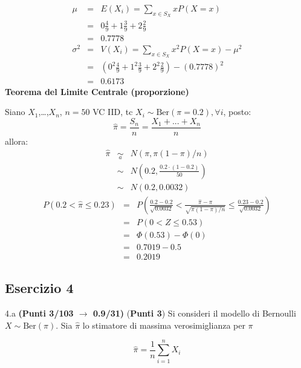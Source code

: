 \documentclass[
  11pt,
]{book}
\theoremstyle{mytheoremstyle}
\theoremstyle{mydefstyle}
\newenvironment{sol}
  {
  \begin{tcolorbox}[enhanced,breakable,arc=0.1mm,boxrule=1pt,colback=white,colframe=iblue,
  title=\bf \fontfamily{lmss}\selectfont \hspace{.5 cm} Soluzione,drop fuzzy shadow]

}{
\end{tcolorbox}
  }
\begin{document}
\begin{sol}
\begin{eqnarray*} \mu &=& E(X_i) = \sum_{x\in S_X}x P(X=x)\\ 
 &=&  0  \frac { 4 }{ 9 }+ 1  \frac { 3 }{ 9 }+ 2  \frac { 2 }{ 9 } \\ 
            &=& 0.7778 \\ 
 \sigma^2 &=& V(X_i) = \sum_{x\in S_X}x^2 P(X=x)-\mu^2\\ 
 &=&\left(  0  ^2\frac { 4 }{ 9 }+ 1  ^2\frac { 3 }{ 9 }+ 2  ^2\frac { 2 }{ 9 } \right)-( 0.7778 )^2\\ 
            &=& 0.6173 
\end{eqnarray*}
\textbf{Teorema del Limite Centrale (proporzione)}

Siano \(X_1\),\ldots,\(X_n\), \(n=50\) VC IID, tc \(X_i\sim\text{Ber}(\pi=0.2)\)\(,\forall i\), posto:
\[
      \hat\pi=\frac{S_n}n = \frac{X_1 + ... + X_n}n
      \]
allora:\begin{eqnarray*}
  \hat\pi & \mathop{\sim}\limits_{a}& N(\pi,\pi(1-\pi)/n) \\
  &\sim & N\left(0.2,\frac{0.2\cdot(1-0.2)}{50}\right) \\
     &\sim & N(0.2,0.0032) 
  \end{eqnarray*}\begin{eqnarray*}
   P( 0.2 < \hat\pi \leq  0.23 ) &=& P\left( \frac { 0.2  -  0.2 }{\sqrt{ 0.0032 }} < \frac { \hat\pi  -  \pi }{ \sqrt{\pi(1-\pi)/n} } \leq \frac { 0.23  -  0.2 }{\sqrt{ 0.0032 }}\right)  \\
              &=& P\left(  0  < Z \leq  0.53 \right) \\
              &=& \Phi( 0.53 )-\Phi( 0 )\\
              &=&  0.7019 - 0.5 \\ 
              &=&  0.2019 
   \end{eqnarray*}

\end{sol}

\subsection{Esercizio 4}\label{esercizio-4-37}

4.a \textbf{(Punti 3/103 \(\rightarrow\) 0.9/31)} (\textbf{Punti 3}) Si consideri il modello di Bernoulli \(X\sim\text{Ber}(\pi)\). Sia \(\hat\pi\) lo stimatore di massima verosimiglianza per \(\pi\)

\[
  \hat\pi = \frac 1n \sum_{i=1}^n X_i
\]
\end{document}
